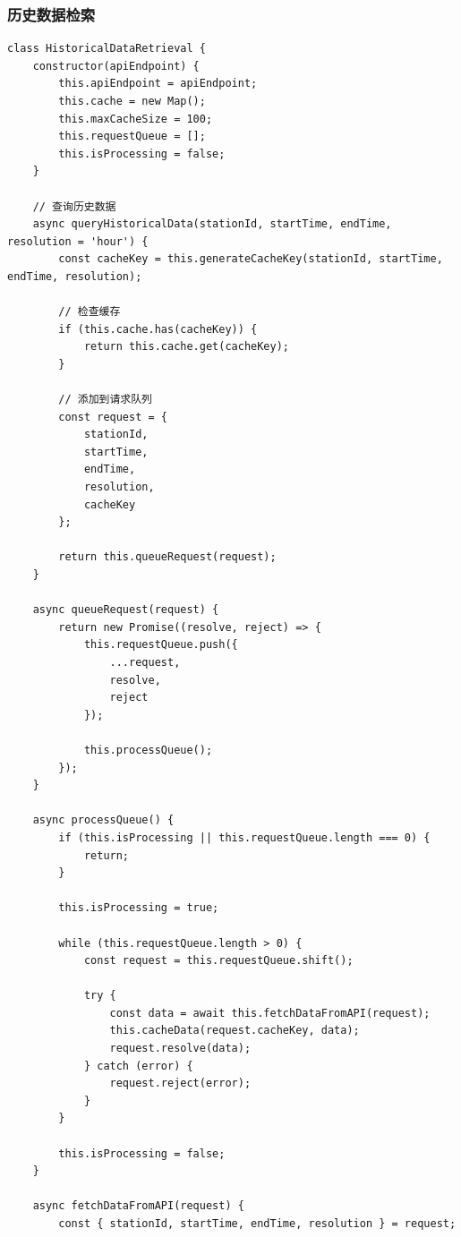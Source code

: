 \subsubsection{历史数据检索}\label{ux5386ux53f2ux6570ux636eux68c0ux7d22}

\begin{lstlisting}
class HistoricalDataRetrieval {
    constructor(apiEndpoint) {
        this.apiEndpoint = apiEndpoint;
        this.cache = new Map();
        this.maxCacheSize = 100;
        this.requestQueue = [];
        this.isProcessing = false;
    }
    
    // 查询历史数据
    async queryHistoricalData(stationId, startTime, endTime, resolution = 'hour') {
        const cacheKey = this.generateCacheKey(stationId, startTime, endTime, resolution);
        
        // 检查缓存
        if (this.cache.has(cacheKey)) {
            return this.cache.get(cacheKey);
        }
        
        // 添加到请求队列
        const request = {
            stationId,
            startTime,
            endTime,
            resolution,
            cacheKey
        };
        
        return this.queueRequest(request);
    }
    
    async queueRequest(request) {
        return new Promise((resolve, reject) => {
            this.requestQueue.push({
                ...request,
                resolve,
                reject
            });
            
            this.processQueue();
        });
    }
    
    async processQueue() {
        if (this.isProcessing || this.requestQueue.length === 0) {
            return;
        }
        
        this.isProcessing = true;
        
        while (this.requestQueue.length > 0) {
            const request = this.requestQueue.shift();
            
            try {
                const data = await this.fetchDataFromAPI(request);
                this.cacheData(request.cacheKey, data);
                request.resolve(data);
            } catch (error) {
                request.reject(error);
            }
        }
        
        this.isProcessing = false;
    }
    
    async fetchDataFromAPI(request) {
        const { stationId, startTime, endTime, resolution } = request;
        

\end{lstlisting}
